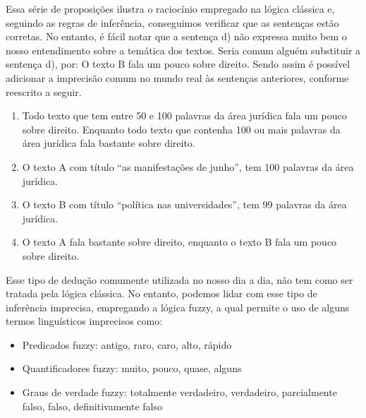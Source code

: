 Essa série de proposições ilustra o raciocínio empregado na lógica clássica e, seguindo as regras de inferência, conseguimos verificar que as sentenças estão corretas. No entanto, é fácil notar que a sentença d) não expressa muito bem o
nosso entendimento sobre a temática dos textos.  Seria comum alguém substituir a sentença d), por: O texto B fala um pouco sobre direito.  Sendo assim é possível adicionar a imprecisão comum no mundo real às sentenças anteriores, conforme reescrito a seguir.

\begin{enumerate}[label=\alph*)] 
\item Todo texto que tem entre 50 e 100 palavras da área jurídica fala um pouco sobre direito.  Enquanto todo texto que contenha 100 ou mais palavras da área jurídica fala bastante sobre direito.  
\item O texto A com título ``as manifestações de junho'', tem 100 palavras da área jurídica.  
\item O texto B com título ``política nas universidades'', tem 99 palavras da área jurídica.  
\item O texto A fala bastante sobre direito, enquanto o texto B fala um pouco sobre direito. 
\end{enumerate} 

Esse tipo de dedução comumente utilizada no nosso dia a dia, não tem como ser tratada pela lógica
clássica. No entanto, podemos lidar com esse tipo de inferência imprecisa, empregando a
lógica fuzzy, a qual permite o uso de alguns termos linguísticos imprecisos como:
\begin{itemize} 
\item Predicados fuzzy: antigo, raro, caro, alto, rápido 
\item Quantificadores fuzzy: muito, pouco, quase, alguns 
\item Graus de verdade fuzzy: totalmente verdadeiro, verdadeiro, parcialmente falso, falso, definitivamente falso 
\end{itemize}

%
%


